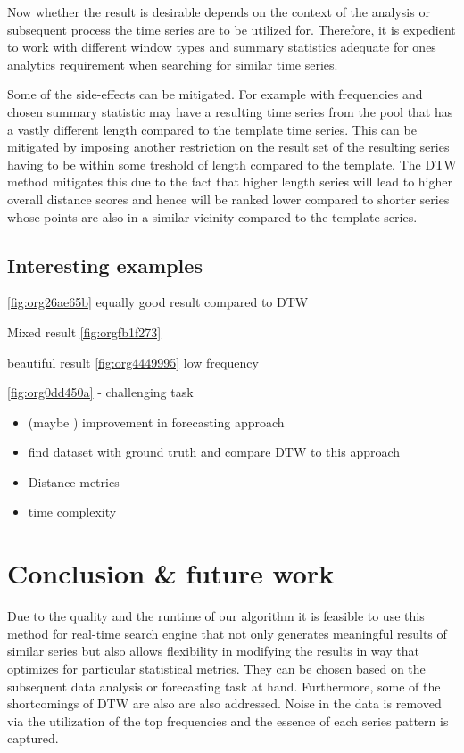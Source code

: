 \documentclass[phd,black, hidelinks]{PrincetonThesis}
\begin{document}
Now whether the result is desirable depends on the context of the analysis or subsequent process the time series are to be utilized for. Therefore, it is expedient to work with different window types and summary statistics adequate for ones analytics requirement when searching for similar time series.

Some of the side-effects can be mitigated. For example with frequencies and chosen summary statistic may have a resulting time series from the pool that has a vastly different length compared to the template time series. This can be mitigated by imposing another restriction on the result set of the resulting series having to be within some treshold of length compared to the template. The DTW method mitigates this due to the fact that higher length series will lead to higher overall distance scores and hence will be ranked lower compared to shorter series whose points are also in a similar vicinity compared to the template series.

\section{Interesting examples}
\label{sec:orga29f063}
\ref{fig:org26ae65b} equally good result compared to DTW

Mixed result \ref{fig:orgfb1f273}


beautiful result \ref{fig:org4449995}
low frequency

\ref{fig:org0dd450a} - challenging task

\begin{itemize}
\item (maybe ) improvement in forecasting approach
\item find dataset with ground truth and compare DTW to this approach
\item Distance metrics
\item time complexity
\end{itemize}
\chapter{Conclusion \& future work}
\label{sec:org5651f95}

Due to the quality and the runtime of our algorithm it is feasible to use this method for real-time search engine that not only generates meaningful results of similar series but also allows flexibility in modifying the results in way that optimizes for particular statistical metrics. They can be chosen based on the subsequent data analysis or forecasting task at hand. Furthermore, some of the shortcomings of DTW are also are also addressed. Noise in the data is removed via the utilization of the top frequencies and the essence of each series pattern is captured.
\end{document}
